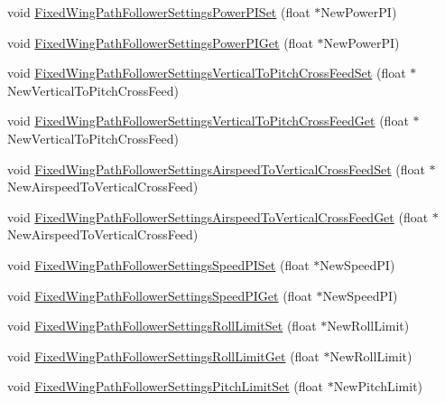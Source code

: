 \begin{DoxyCompactItemize}
void \hyperlink{group___fixed_wing_path_follower_settings_ga053579c99dbbeda3daee2e55daf41b14}{\-Fixed\-Wing\-Path\-Follower\-Settings\-Power\-P\-I\-Set} (float $\ast$\-New\-Power\-P\-I)
\item 
void \hyperlink{group___fixed_wing_path_follower_settings_ga1ce6fe314ad8a7c4edefb05e9d11ef6f}{\-Fixed\-Wing\-Path\-Follower\-Settings\-Power\-P\-I\-Get} (float $\ast$\-New\-Power\-P\-I)
\item 
void \hyperlink{group___fixed_wing_path_follower_settings_ga2225a1b25be24eaab98146736271c08e}{\-Fixed\-Wing\-Path\-Follower\-Settings\-Vertical\-To\-Pitch\-Cross\-Feed\-Set} (float $\ast$\-New\-Vertical\-To\-Pitch\-Cross\-Feed)
\item 
void \hyperlink{group___fixed_wing_path_follower_settings_gaaf6f919a315877ff552863267cdc2eb5}{\-Fixed\-Wing\-Path\-Follower\-Settings\-Vertical\-To\-Pitch\-Cross\-Feed\-Get} (float $\ast$\-New\-Vertical\-To\-Pitch\-Cross\-Feed)
\item 
void \hyperlink{group___fixed_wing_path_follower_settings_ga284f7bd4a3dcd3dfa5f144605a0bc634}{\-Fixed\-Wing\-Path\-Follower\-Settings\-Airspeed\-To\-Vertical\-Cross\-Feed\-Set} (float $\ast$\-New\-Airspeed\-To\-Vertical\-Cross\-Feed)
\item 
void \hyperlink{group___fixed_wing_path_follower_settings_gafaf2b0a9a7eec286493b39604b0cc452}{\-Fixed\-Wing\-Path\-Follower\-Settings\-Airspeed\-To\-Vertical\-Cross\-Feed\-Get} (float $\ast$\-New\-Airspeed\-To\-Vertical\-Cross\-Feed)
\item 
void \hyperlink{group___fixed_wing_path_follower_settings_ga6bb0baae5eebede9845c494d4d33a02b}{\-Fixed\-Wing\-Path\-Follower\-Settings\-Speed\-P\-I\-Set} (float $\ast$\-New\-Speed\-P\-I)
\item 
void \hyperlink{group___fixed_wing_path_follower_settings_ga56f430605777dd40034c3ce7c3f9ecc9}{\-Fixed\-Wing\-Path\-Follower\-Settings\-Speed\-P\-I\-Get} (float $\ast$\-New\-Speed\-P\-I)
\item 
void \hyperlink{group___fixed_wing_path_follower_settings_ga27b1ec863649cae48916f456f1901c8a}{\-Fixed\-Wing\-Path\-Follower\-Settings\-Roll\-Limit\-Set} (float $\ast$\-New\-Roll\-Limit)
\item 
void \hyperlink{group___fixed_wing_path_follower_settings_gac59f6bc507965b6d72b1433183eddf41}{\-Fixed\-Wing\-Path\-Follower\-Settings\-Roll\-Limit\-Get} (float $\ast$\-New\-Roll\-Limit)
\item 
void \hyperlink{group___fixed_wing_path_follower_settings_ga8b55a976c936d60bf55d163926aea63e}{\-Fixed\-Wing\-Path\-Follower\-Settings\-Pitch\-Limit\-Set} (float $\ast$\-New\-Pitch\-Limit)

\end{DoxyCompactItemize}
